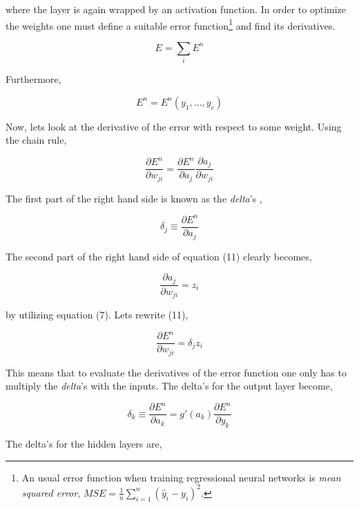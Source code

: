 \documentclass[12pt, letterpaper]{amsart}%
\begin{document}
where the layer is again wrapped by an activation function. In order to optimize the weights one must define a suitable error function\footnote{An usual error function when training regressional neural networks is \textit{mean squared error}, $MSE = \frac{1}{n} \sum_{i=1}^n (\hat{y}_i - y_i)^2$.} and find its derivatives.

\begin{equation}
    E = \sum_i E^n
\end{equation}

Furthermore, 

\begin{equation}
    E^n = E^n(y_1,...,y_c)
\end{equation}

Now, lets look at the derivative of the error with respect to some weight. Using the chain rule,

\begin{equation}
    \frac{\partial E^n}{\partial w_{ji}} = \frac{\partial E^n}{\partial a_j} \frac{\partial a_j}{\partial w_{ji}}
\end{equation}

The first part of the right hand side is known as the \textit{delta}'s ,

\begin{equation}
    \delta_j \equiv \frac{\partial E^n}{\partial a_j}
\end{equation}

The second part of the right hand side of equation (11) clearly becomes,

\begin{equation}
    \frac{\partial a_j}{\partial w_{ji}} = z_i
\end{equation}

by utilizing equation (7). Lets rewrite (11),

\begin{equation}
    \frac{\partial E^n}{\partial w_{ji}} = \delta_j z_i
\end{equation}

This means that to evaluate the derivatives of the error function one only has to multiply the \textit{delta}'s with the inputs. The delta's for the output layer become,

\begin{equation}
    \delta_k \equiv \frac{\partial E^n}{\partial a_k} = g \prime (a_k) \frac{\partial E^n}{\partial y_k}
\end{equation}

The delta's for the hidden layers are,
\end{document}
